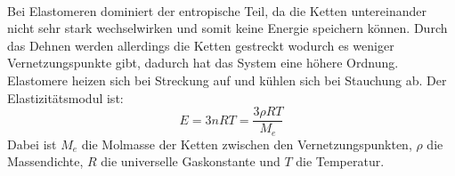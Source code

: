 \documentclass[11pt,a4paper]{article}
\numberwithin{equation}{section}
\numberwithin{figure}{section}
\begin{document}
\\
\begin{addmargin}[25pt]{0pt}
Bei Elastomeren dominiert der entropische Teil, da die Ketten untereinander nicht sehr stark wechselwirken und somit keine Energie speichern können. Durch das Dehnen werden allerdings die Ketten gestreckt wodurch es weniger Vernetzungspunkte gibt, dadurch hat das System eine höhere Ordnung. Elastomere heizen sich bei Streckung auf und kühlen sich bei Stauchung ab. Der Elastizitätsmodul ist:
\begin{equation}\label{eq:E_Modul_Elastomere}
    E = 3nRT = \frac{3\rho RT}{M_e}
\end{equation}
Dabei ist $M_e$ die Molmasse der Ketten zwischen den Vernetzungspunkten, $\rho$ die Massendichte, $R$ die universelle Gaskonstante  und $T$ die Temperatur.
\end{addmargin} 
\end{document}
